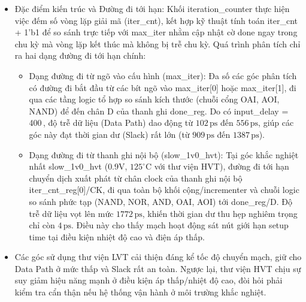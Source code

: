 \documentclass[12pt,a4paper,oneside]{book}
\begin{document}
\begin{itemize}
    \item Đặc điểm kiến trúc và Đường đi tới hạn: Khối iteration\_counter thực hiện việc đếm số vòng lặp giải mã (iter\_cnt), kết hợp kỹ thuật tính toán iter\_cnt + 1'b1 để so sánh trực tiếp với max\_iter nhằm cập nhật cờ done ngay trong chu kỳ mà vòng lặp kết thúc mà không bị trễ chu kỳ. Quá trình phân tích chỉ ra hai dạng đường đi tới hạn chính: 
    \begin{itemize}
        \item Dạng đường đi từ ngõ vào cấu hình (max\_iter): Đa số các góc phân tích có đường đi bắt đầu từ các bít ngõ vào max\_iter[0] hoặc max\_iter[1], đi qua các tầng logic tổ hợp so sánh kích thước (chuỗi cổng OAI, AOI, NAND) để đến chân D của thanh ghi done\_reg. Do có input\_delay = 400\,, độ trễ dữ liệu (Data Path) dao động từ $102\,\text{ps}$ đến $556\,\text{ps}$, giúp các góc này đạt thời gian dư (Slack) rất lớn (từ $909\,\text{ps}$ đến $1387\,\text{ps}$).
        \item Dạng đường đi từ thanh ghi nội bộ (slow\_1v0\_hvt): Tại góc khắc nghiệt nhất slow\_1v0\_hvt ($0.9\text{V}$, $125^\circ\text{C}$ với thư viện HVT), đường đi tới hạn chuyển dịch xuất phát từ chân clock của thanh ghi nội bộ iter\_cnt\_reg[0]/CK, đi qua toàn bộ khối cộng/incrementer và chuỗi logic so sánh phức tạp (NAND, NOR, AND, OAI, AOI) tới done\_reg/D. Độ trễ dữ liệu vọt lên mức $1772\,\text{ps}$, khiến thời gian dư thu hẹp nghiêm trọng chỉ còn $4\,\text{ps}$. Điều này cho thấy mạch hoạt động sát nút giới hạn setup time tại điều kiện nhiệt độ cao và điện áp thấp.
    \end{itemize}
    \item Các góc sử dụng thư viện LVT cải thiện đáng kể tốc độ chuyển mạch, giữ cho Data Path ở mức thấp và Slack rất an toàn. Ngược lại, thư viện HVT chịu sự suy giảm hiệu năng mạnh ở điều kiện áp thấp/nhiệt độ cao, đòi hỏi phải kiểm tra cẩn thận nếu hệ thống vận hành ở môi trường khắc nghiệt.
\end{itemize}
\end{document}

